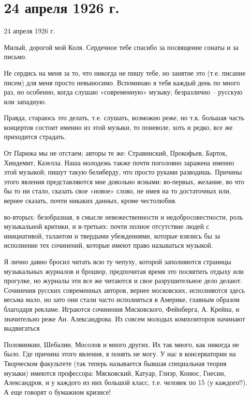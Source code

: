 \section{24 апреля 1926 г.}


24 апреля 1926 г.

Милый, дорогой мой Коля. Сердечное тебе
спасибо за посвящение сонаты и за письмо.

Не сердись на меня за то, что никогда не
пишу тебе, но занятие это (т.е. писание писем) для меня
просто невыносимо. Вспоминаю я тебя
каждый день по много раз, но особенно,
когда слушаю «современную» музыку;
безразлично -- русскую или западную.

Правда, стараюсь это делать, т.е.
слушать, возможно реже, но т.к.
большая часть концертов состоит именно
из этой музыки, то поневоле, хоть и
редко, все же приходится страдать.

От Парижа мы не отстаем; авторы
те же: Стравинский, Прокофьев, Барток,
Хиндемит, Казелла. Наша молодежь также
почти поголовно заражена именно этой музыкой;
пишут такую белиберду, что просто руками
разводишь. Причины этого явления
представляются мне довольно ясными:
во-первых, желание, во что бы то ни
стало, сказать свое «новое» слово, не имея
на то достаточных или, вернее сказать, почти
никаких данных, кроме честолюбия.


\noindent
во-вторых: безобразная, в смысле невежественности
и недобросовестности, роль музыкальной критики,
и в-третьих: почти полное отсутствие людей
с инициативой, талантом и твердыми
убеждениями, которые взялись бы
за исполнение тех сочинений, которые
имеют право называться музыкой.

Я лично давно бросил читать
всю ту чепуху, которой заполняются
страницы музыкальных журналов и брошюр,
предпочитая время это посвятить отдыху
или прогулке, но журналы эти
все же читаются и свое разрушительное дело делают. Сочинения
русских современных авторов, вернее
московских, исполняются здесь
весьма мало, но зато они стали
часто исполняться в Америке,
главным образом благодаря рекламе.
Играются сочинения Мясковского,
Фейнберга, А. Крейна, и значительно реже
Ан. Александрова. Из совсем молодых
композиторов начинают выдвигаться


\noindent
Половинкин, Шебалин, Мосолов и много
других. Их так много, как никогда не
было. Где причина этого явления, я
понять не могу. У нас в консерватории
на Творческом факультете (так
теперь называется бывшая специальная теория
музыки) имеются профессора: Мясковский,
Катуар, Глиэр, Конюс, Гнесин, Александров,
и у каждого из них большой класс,
т.е. человек по 15 (у каждого!!).
А еще говорят о бумажном кризисе!


